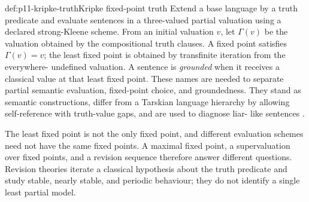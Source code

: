 \begin{hbdefinition}{def:p11-kripke-truth}{Kripke fixed-point truth}
Extend a base language by a truth predicate and evaluate sentences in a
three-valued partial valuation using a declared strong-Kleene scheme. From an
initial valuation \(v\), let \(\Gamma(v)\) be the valuation obtained by the
compositional truth clauses. A fixed point satisfies \(\Gamma(v)=v\); the least
fixed point is obtained by transfinite iteration from the everywhere-
undefined valuation. A sentence is \emph{grounded} when it receives a
classical value at that least fixed point. These names are needed to separate
partial semantic evaluation, fixed-point choice, and groundedness. They stand
as semantic constructions, differ from a Tarskian language hierarchy by
allowing self-reference with truth-value gaps, and are used to diagnose liar-
like sentences \cite{Kripke1975,Martin1984}.
\end{hbdefinition}

The least fixed point is not the only fixed point, and different evaluation
schemes need not have the same fixed points. A maximal fixed point, a
supervaluation over fixed points, and a revision sequence therefore answer
different questions. Revision theories iterate a classical hypothesis about
the truth predicate and study stable, nearly stable, and periodic behaviour;
they do not identify a single least partial model.

